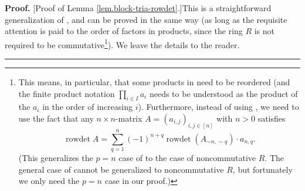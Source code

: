 \documentclass[numbers=enddot,12pt,final,onecolumn,notitlepage,english]{scrartcl}%
\theoremstyle{definition}
\newenvironment{proof}[1][Proof]{\noindent\textbf{#1.} }{\ \rule{0.5em}{0.5em}}
\let\sumnonlimits\sum
\let\prodnonlimits\prod
\renewcommand{\sum}{\sumnonlimits\limits}
\renewcommand{\prod}{\prodnonlimits\limits}
\newenvironment{vershort}{}{}
\begin{document}
\begin{vershort}
\begin{proof}
[Proof of Lemma \ref{lem.block-tria-rowdet}.]This is a straightforward
generalization of \cite[Exercise 6.29]{detnotes}, and can be proved in the
same way (as long as the requisite attention is paid to the order of factors
in products, since the ring $R$ is not required to be
commutative\footnote{This means, in particular, that some products in
\cite[solution to Exercise 6.29]{detnotes} need to be reordered (and the
finite product notation $\prod_{i\in I}a_{i}$ needs to be understood as the
product of the $a_{i}$ in the order of increasing $i$). Furthermore, instead
of using \cite[Theorem 6.82 \textbf{(a)}]{detnotes}, we need to use the fact
that any $n\times n$-matrix $A=\left(  a_{i,j}\right)  _{i,j\in\left[
n\right]  }$ with $n>0$ satisfies%
\[
\operatorname*{rowdet}A=\sum_{q=1}^{n}\left(  -1\right)  ^{n+q}%
\operatorname*{rowdet}\left(  A_{\sim n,\sim q}\right)  \cdot a_{n,q}.
\]
(This generalizes the $p=n$ case of \cite[Theorem 6.82 \textbf{(a)}]{detnotes}
to the case of noncommutative $R$. The general case of \cite[Theorem 6.82
\textbf{(a)}]{detnotes} cannot be generalized to noncommutative $R$, but
fortunately we only need the $p=n$ case in our proof.)}). We leave the details
to the reader.
\end{proof}
\end{vershort}
\end{document}
